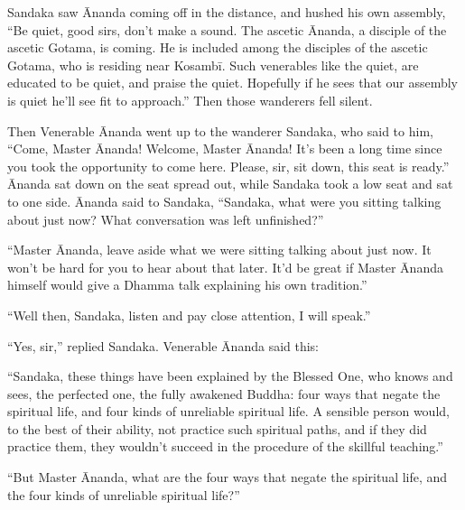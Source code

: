 \documentclass[12pt,openany]{book}%
\begin{document}
Sandaka saw Ānanda coming off in the distance, and hushed his own assembly, “Be quiet, good sirs, don’t make a sound. The ascetic Ānanda, a disciple of the ascetic Gotama, is coming. He is included among the disciples of the ascetic Gotama, who is residing near \textsanskrit{Kosambī}. Such venerables like the quiet, are educated to be quiet, and praise the quiet. Hopefully if he sees that our assembly is quiet he’ll see fit to approach.” Then those wanderers fell silent. 

Then Venerable Ānanda went up to the wanderer Sandaka, who said to him, “Come, Master Ānanda! Welcome, Master Ānanda! It’s been a long time since you took the opportunity to come here. Please, sir, sit down, this seat is ready.” Ānanda sat down on the seat spread out, while Sandaka took a low seat and sat to one side. Ānanda said to Sandaka, “Sandaka, what were you sitting talking about just now? What conversation was left unfinished?” 

“Master Ānanda, leave aside what we were sitting talking about just now. It won’t be hard for you to hear about that later. It’d be great if Master Ānanda himself would give a Dhamma talk explaining his own tradition.” 

“Well then, Sandaka, listen and pay close attention, I will speak.” 

“Yes, sir,” replied Sandaka. Venerable Ānanda said this: 

“Sandaka, these things have been explained by the Blessed One, who knows and sees, the perfected one, the fully awakened Buddha: four ways that negate the spiritual life, and four kinds of unreliable spiritual life. A sensible person would, to the best of their ability, not practice such spiritual paths, and if they did practice them, they wouldn’t succeed in the procedure of the skillful teaching.” 

“But Master Ānanda, what are the four ways that negate the spiritual life, and the four kinds of unreliable spiritual life?” 
\end{document}
